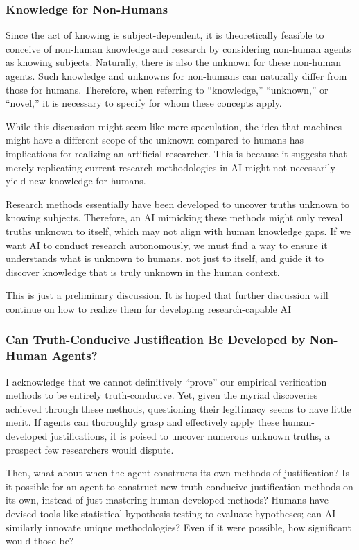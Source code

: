 \documentclass{article}
\begin{document}
\subsubsection{Knowledge for Non-Humans}

Since the act of knowing is subject-dependent, it is theoretically feasible to conceive of non-human knowledge and research by considering non-human agents as knowing subjects. Naturally, there is also the unknown for these non-human agents. Such knowledge and unknowns for non-humans can naturally differ from those for humans. Therefore, when referring to ``knowledge,'' ``unknown,'' or ``novel,'' it is necessary to specify for whom these concepts apply.

While this discussion might seem like mere speculation, the idea that machines might have a different scope of the unknown compared to humans has implications for realizing an artificial researcher. This is because it suggests that merely replicating current research methodologies in AI might not necessarily yield new knowledge for humans.

Research methods essentially have been developed to uncover truths unknown to knowing subjects. Therefore, an AI mimicking these methods might only reveal truths unknown to itself, which may not align with human knowledge gaps. If we want AI to conduct research autonomously, we must find a way to ensure it understands what is unknown to humans, not just to itself, and guide it to discover knowledge that is truly unknown in the human context.

This is just a preliminary discussion. It is hoped that further discussion will continue on how to realize them for developing research-capable AI

\subsubsection{Can Truth-Conducive Justification Be Developed by Non-Human Agents?}

I acknowledge that we cannot definitively ``prove'' our empirical verification methods to be entirely truth-conducive. Yet, given the myriad discoveries achieved through these methods, questioning their legitimacy seems to have little merit. If agents can thoroughly grasp and effectively apply these human-developed justifications, it is poised to uncover numerous unknown truths, a prospect few researchers would dispute.

Then, what about when the agent constructs its own methods of justification? Is it possible for an agent to construct new truth-conducive justification methods on its own, instead of just mastering human-developed methods? Humans have devised tools like statistical hypothesis testing to evaluate hypotheses; can AI similarly innovate unique methodologies? Even if it were possible, how significant would those be?
\end{document}
